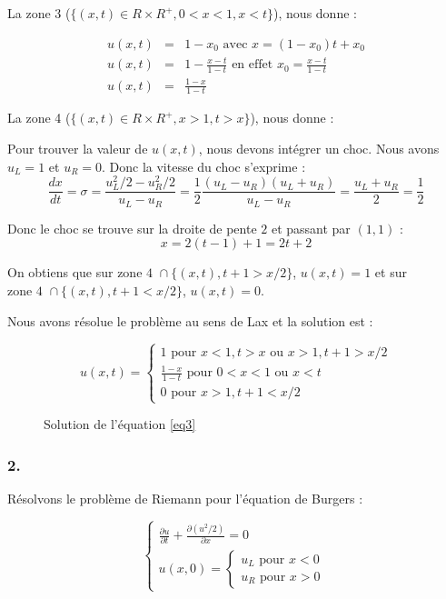 \documentclass{article}
\begin{document}
La zone 3 ($\{(x,t) \in R \times R^{+}, 0 < x < 1, x < t \}$), nous donne :

\begin{eqnarray*}
	u(x,t) &=& 1 - x_0 \text{ avec } x = (1-x_0) t + x_0 \\
	u(x,t) &=& 1 - \frac{x-t}{1-t} \text{ en effet } x_0 = \frac{x-t}{1-t} \\
	u(x,t) &=& \frac{1-x}{1-t}  
\end{eqnarray*}

La zone 4 ($\{(x,t) \in R \times R^+, x > 1, t > x\}$), nous donne :

Pour trouver la valeur de $u(x,t)$, nous devons intégrer un choc. Nous avons $u_L=1$ et $u_R=0$. Donc la vitesse du choc s'exprime :
\[ \frac{dx}{dt} = \sigma = \frac{u_L^2/2 - u_R^2/2}{u_L - u_R} = \frac{1}{2} \frac{(u_L-u_R)(u_L+u_R)}{u_L-u_R} = \frac{u_L+u_R}{2} = \frac{1}{2} \]

Donc le choc se trouve sur la droite de pente $2$ et passant par $(1,1)$ :
\[ x = 2 (t - 1) + 1 = 2t + 2 \]

On obtiens que sur $\text{zone 4 } \cap \{(x,t), t+1 > x/2\}$, $u(x,t) = 1$ et sur $\text{zone 4 } \cap \{(x,t), t+1 < x/2\}$, $u(x,t) = 0$.
\newline

Nous avons résolue le problème au sens de Lax et la solution est : 

\[u(x,t) = \left\{ \begin{matrix}
	1 \text{ pour } x<1, t>x \text{ ou } x>1, t+1>x/2 \\
	\frac{1-x}{1-t} \text{ pour } 0<x<1 \text{ ou } x<t \\
	0 \text{ pour } x>1, t+1<x/2
\end{matrix} \right.
\tag{Sol3}
\]

\begin{figure}[H]
  
  \caption{Solution de l'équation \ref{eq3}}
\end{figure}

\subsubsection*{2.}

Résolvons le problème de Riemann pour l'équation de Burgers :

\[ \left\{ \begin{matrix}
	\frac{\partial u}{\partial t} + \frac{\partial (u^2/2)}{\partial x} = 0 \\
	u(x,0) = \left\{ \begin{matrix}
					u_L \text{ pour } x<0 \\
					u_R \text{ pour } x>0
	\end{matrix} \right.
\end{matrix} \right.
\label{eq4} \tag{Burgers2}
\]
\end{document}
